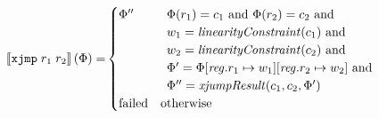 \documentclass[a4paper]{article}
\begin{document}
\begin{align*}
  \sem{\txjmp{r_1}{r_2}}(\Phi) = &
                                   \begin{cases}
                                       \Phi''
                                     &
                                     \begin{array}[t]{l}
                                       \Phi(r_1) = c_1 \tand
                                       \Phi(r_2) = c_2 \tand\\
                                       w_1 = \linCons{c_1} \tand \\
                                       w_2 = \linCons{c_2} \tand \\
                                       \Phi' = \Phi \updReg{r_1}{w_1} \updReg{r_2}{w_2} \tand\\
                                       \Phi'' = \xjumpResult{c_1}{c_2}{\Phi'}
                                     \end{array}\\
                                     \failed & \totherwise
                                   \end{cases}
\end{align*}
\end{document}
